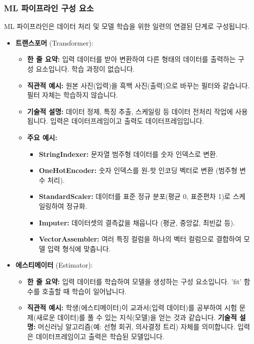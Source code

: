 \documentclass[11pt,a4paper]{article}
\theoremstyle{definition}
\begin{document}
\subsubsection*{ML 파이프라인 구성 요소}
ML 파이프라인은 데이터 처리 및 모델 학습을 위한 일련의 연결된 단계로 구성됩니다.
\begin{itemize}
    \item \textbf{트랜스포머} (Transformer):
    \begin{itemize}
        \item \textbf{한 줄 요약:} 입력 데이터를 받아 변환하여 다른 형태의 데이터를 출력하는 구성 요소입니다. 학습 과정이 없습니다.
        \item \textbf{직관적 예시:} 원본 사진(입력)을 흑백 사진(출력)으로 바꾸는 필터와 같습니다. 필터 자체는 학습하지 않습니다.
        \item \textbf{기술적 설명:} 데이터 정제, 특징 추출, 스케일링 등 데이터 전처리 작업에 사용됩니다. 입력은 데이터프레임이고 출력도 데이터프레임입니다.
        \item \textbf{주요 예시:}
        \begin{itemize}
            \item \textbf{StringIndexer:} 문자열 범주형 데이터를 숫자 인덱스로 변환.
            \item \textbf{OneHotEncoder:} 숫자 인덱스를 원-핫 인코딩 벡터로 변환 (범주형 변수 처리).
            \item \textbf{StandardScaler:} 데이터를 표준 정규 분포(평균 0, 표준편차 1)로 스케일링하여 정규화.
            \item \textbf{Imputer:} 데이터셋의 결측값을 채웁니다 (평균, 중앙값, 최빈값 등).
            \item \textbf{VectorAssembler:} 여러 특징 컬럼을 하나의 벡터 컬럼으로 결합하여 모델 입력 형식에 맞춥니다.
        \end{itemize}
    \end{itemize}
    \item \textbf{에스티메이터} (Estimator):
    \begin{itemize}
        \item \textbf{한 줄 요약:} 입력 데이터를 학습하여 모델을 생성하는 구성 요소입니다. 'fit' 함수를 호출할 때 학습이 일어납니다.
        \item \textbf{직관적 예시:} 학생(에스티메이터)이 교과서(입력 데이터)를 공부하여 시험 문제(새로운 데이터)를 풀 수 있는 지식(모델)을 얻는 것과 같습니다.
        \textbf{기술적 설명:} 머신러닝 알고리즘(예: 선형 회귀, 의사결정 트리) 자체를 의미합니다. 입력은 데이터프레임이고 출력은 학습된 모델입니다.

\end{itemize}
\end{itemize}
\end{document}
